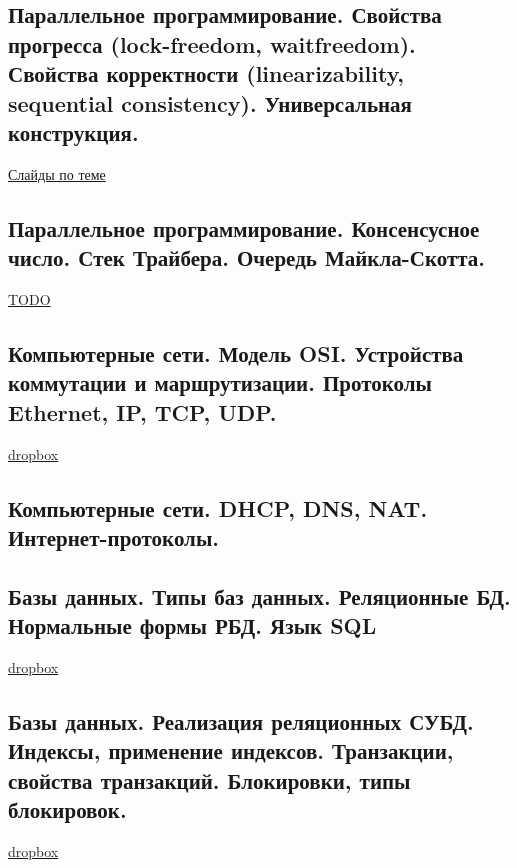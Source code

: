 \documentclass{article}
\begin{document}
\subsection{Параллельное программирование. Свойства прогресса (lock-freedom, waitfreedom). Свойства корректности (linearizability, sequential consistency). Универсальная конструкция.}

\href{https://www.babichev.org/tpmtp/Lecture08.pdf}{Слайды по теме}

\subsection{Параллельное программирование. Консенсусное число. Стек Трайбера. Очередь Майкла-Скотта.}
	
\href{https://www.babichev.org/tpmtp/Lecture09.pdf}{TODO}

\subsection{Компьютерные сети. Модель OSI. Устройства коммутации и маршрутизации. Протоколы Ethernet, IP, TCP, UDP.}

\href{https://www.dropbox.com/sh/4st5b16mvdf8gkj/AAAI9sbKs_C3TFgRbqWGrAeca/Programming/16%20%D0%9A%D0%BE%D0%BC%D0%BF%D1%8C%D1%8E%D1%82%D0%B5%D1%80%D0%BD%D1%8B%D0%B5%20%D1%81%D0%B5%D1%82%D0%B8.pdf?dl=0}{dropbox}

\subsection{Компьютерные сети. DHCP, DNS, NAT. Интернет-протоколы.}

\subsection{Базы данных. Типы баз данных. Реляционные БД. Нормальные формы РБД. Язык SQL}

\href{https://www.dropbox.com/sh/4st5b16mvdf8gkj/AACJWcRNv0lFmPzhlkMSxN7Va/Programming/12%20%D0%91%D0%B0%D0%B7%D1%8B%20%D0%B4%D0%B0%D0%BD%D0%BD%D1%8B%D1%85.pdf?dl=0}{dropbox}

\subsection{Базы данных. Реализация реляционных СУБД. Индексы, применение индексов. Транзакции, свойства транзакций. Блокировки, типы блокировок.}

\href{https://www.dropbox.com/sh/4st5b16mvdf8gkj/AADo-NrUSL5vJLWDfeAFWwy1a/Programming/13%20%D0%A0%D0%B5%D0%BB%D1%8F%D1%86%D0%B8%D0%BE%D0%BD%D0%BD%D1%8B%D0%B5%20%D0%A1%D0%A3%D0%91%D0%94.pdf?dl=0}{dropbox}
\end{document}
